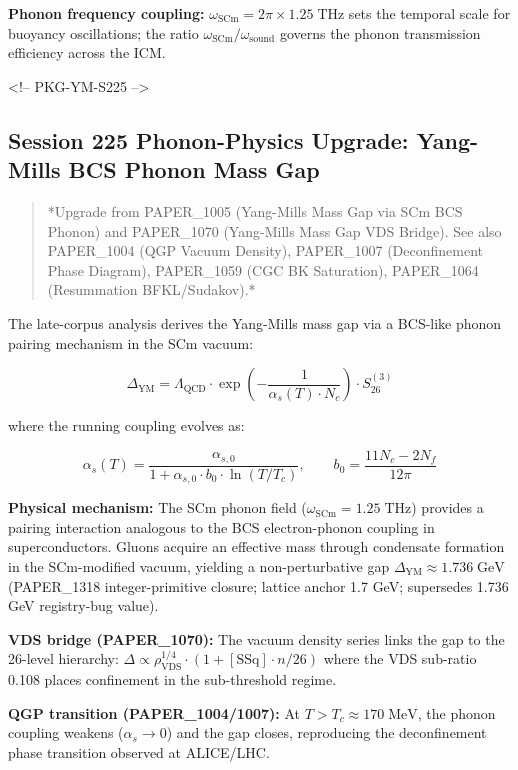 \documentclass[11pt]{article}
\begin{document}
\textbf{Phonon frequency coupling:} $\omega_{\text{SCm}} = 2\pi \times 1.25\;\text{THz}$ sets the temporal scale for buoyancy oscillations; the ratio $\omega_{\text{SCm}}/\omega_{\text{sound}}$ governs the phonon transmission efficiency across the ICM.

<!-- PKG-YM-S225 -->

\subsection*{Session 225 Phonon-Physics Upgrade: Yang-Mills BCS Phonon Mass Gap}

\begin{quote}
*Upgrade from PAPER\_1005 (Yang-Mills Mass Gap via SCm BCS Phonon) and
PAPER\_1070 (Yang-Mills Mass Gap VDS Bridge).  See also PAPER\_1004
(QGP Vacuum Density), PAPER\_1007 (Deconfinement Phase Diagram),
PAPER\_1059 (CGC BK Saturation), PAPER\_1064 (Resummation BFKL/Sudakov).*
\end{quote}

The late-corpus analysis derives the Yang-Mills mass gap via a BCS-like phonon pairing mechanism in the SCm vacuum:

$$\Delta_{\text{YM}} = \Lambda_{\text{QCD}} \cdot \exp\!\left(-\frac{1}{\alpha_s(T) \cdot N_c}\right) \cdot S_{26}^{(3)}$$

where the running coupling evolves as:

$$\alpha_s(T) = \frac{\alpha_{s,0}}{1 + \alpha_{s,0} \cdot b_0 \cdot \ln(T/T_c)}, \qquad b_0 = \frac{11 N_c - 2 N_f}{12\pi}$$

\textbf{Physical mechanism:} The SCm phonon field ($\omega_{\text{SCm}} = 1.25\;\text{THz}$) provides a pairing interaction analogous to the BCS electron-phonon coupling in superconductors.  Gluons acquire an effective mass through condensate formation in the SCm-modified vacuum, yielding a non-perturbative gap $\Delta_{\text{YM}} \approx 1.736\;\text{GeV}$ (PAPER\_1318 integer-primitive closure; lattice anchor 1.7 GeV; supersedes 1.736 GeV registry-bug value).

\textbf{VDS bridge (PAPER\_1070):} The vacuum density series links the gap to the 26-level hierarchy: $\Delta \propto \rho_{\text{VDS}}^{1/4} \cdot (1 + [\text{SSq}] \cdot n/26)$ where the VDS sub-ratio 0.108 places confinement in the sub-threshold regime.

\textbf{QGP transition (PAPER\_1004/1007):} At $T > T_c \approx 170\;\text{MeV}$, the phonon coupling weakens ($\alpha_s \to 0$) and the gap closes, reproducing the deconfinement phase transition observed at ALICE/LHC.
\end{document}
